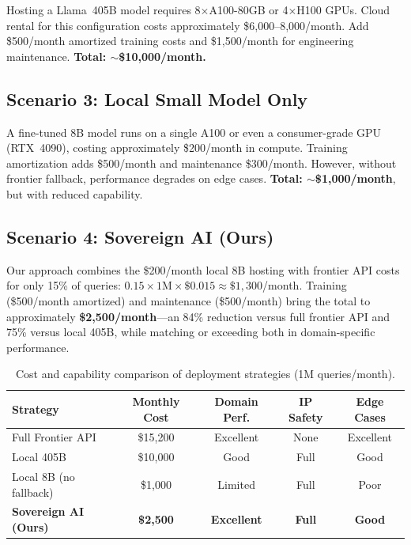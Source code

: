 \documentclass[11pt,a4paper]{article}
\begin{document}
Hosting a Llama~405B model requires 8$\times$A100-80GB or 4$\times$H100 GPUs. Cloud rental for this configuration costs approximately \$6,000--8,000/month. Add \$500/month amortized training costs and \$1,500/month for engineering maintenance. \textbf{Total: $\sim$\$10,000/month.}

\subsection{Scenario 3: Local Small Model Only}

A fine-tuned 8B model runs on a single A100 or even a consumer-grade GPU (RTX~4090), costing approximately \$200/month in compute. Training amortization adds \$500/month and maintenance \$300/month. However, without frontier fallback, performance degrades on edge cases. \textbf{Total: $\sim$\$1,000/month}, but with reduced capability.

\subsection{Scenario 4: Sovereign AI (Ours)}

Our approach combines the \$200/month local 8B hosting with frontier API costs for only 15\% of queries: $0.15 \times 1\text{M} \times \$0.015 \approx \$1,300$/month. Training (\$500/month amortized) and maintenance (\$500/month) bring the total to approximately \textbf{\$2,500/month}---an 84\% reduction versus full frontier API and 75\% versus local 405B, while matching or exceeding both in domain-specific performance.

\begin{table}[t]
\centering
\caption{Cost and capability comparison of deployment strategies (1M queries/month).}
\label{tab:cost}
\begin{tabular}{lcccc}
\toprule
\textbf{Strategy} & \textbf{Monthly Cost} & \textbf{Domain Perf.} & \textbf{IP Safety} & \textbf{Edge Cases} \\
\midrule
Full Frontier API & \$15,200 & Excellent & None & Excellent \\
Local 405B & \$10,000 & Good & Full & Good \\
Local 8B (no fallback) & \$1,000 & Limited & Full & Poor \\
\textbf{Sovereign AI (Ours)} & \textbf{\$2,500} & \textbf{Excellent} & \textbf{Full} & \textbf{Good} \\
\bottomrule
\end{tabular}
\end{table}
\end{document}
